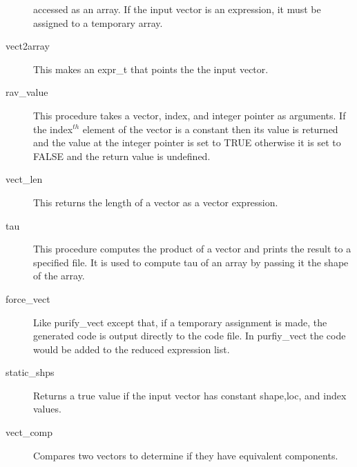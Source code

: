 \begin{description}
accessed as an array.  If the input vector is an expression, it must be
assigned to a temporary array.
\item[vect2array]  This makes an expr\_t that points the the input vector.
\item[rav\_value]  This procedure takes a vector, index, and integer pointer
as arguments.  If the index$^{th}$ element of the vector is a constant then
its value is returned and the value at the integer pointer is set to TRUE
otherwise it is set to FALSE and the return value is undefined.
\item[vect\_len]  This returns the length of a vector as a vector expression.
\item[tau]  This procedure computes the product of a vector and prints the
result to a specified file.  It is used to compute tau of an array by passing 
it the shape of the array.
\item[force\_vect]  Like purify\_vect except that, if a temporary assignment
is made, the generated code is output directly to the code file.  In 
purfiy\_vect the code would be added to the reduced expression list.
\item[static\_shps]  Returns a true value if the input vector has
constant shape,loc, and index values.
\item[vect\_comp] Compares two vectors to determine if they have equivalent
components.
\end{description}

